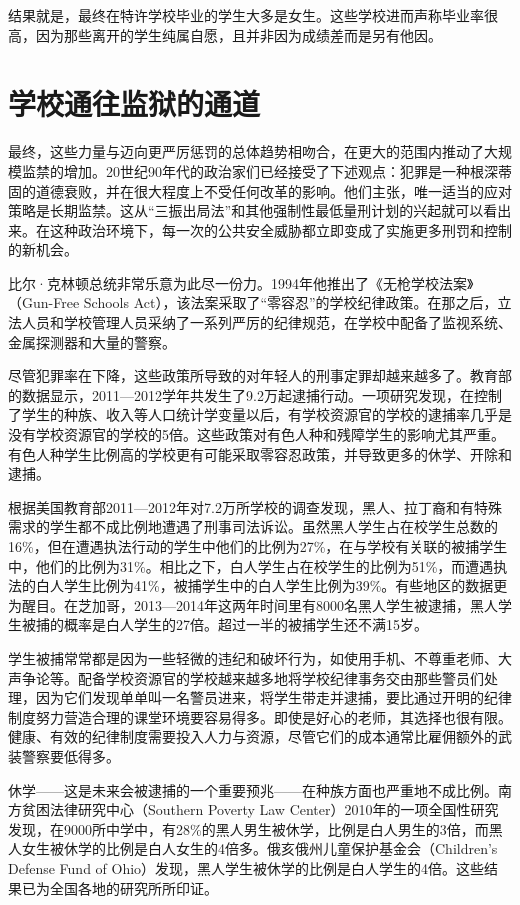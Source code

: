 \documentclass[fontset=fandol, a4paper, 12pt, openright]{ctexbook}
\begin{document}
结果就是，最终在特许学校毕业的学生大多是女生。这些学校进而声称毕业率很高，因为那些离开的学生纯属自愿，且并非因为成绩差而是另有他因。

\section{学校通往监狱的通道}

最终，这些力量与迈向更严厉惩罚的总体趋势相吻合，在更大的范围内推动了大规模监禁的增加。20世纪90年代的政治家们已经接受了下述观点：犯罪是一种根深蒂固的道德衰败，并在很大程度上不受任何改革的影响。他们主张，唯一适当的应对策略是长期监禁。这从“三振出局法”和其他强制性最低量刑计划的兴起就可以看出来。在这种政治环境下，每一次的公共安全威胁都立即变成了实施更多刑罚和控制的新机会。

比尔·克林顿总统非常乐意为此尽一份力。1994年他推出了《无枪学校法案》（Gun-Free Schools Act），该法案采取了“零容忍”的学校纪律政策。在那之后，立法人员和学校管理人员采纳了一系列严厉的纪律规范，在学校中配备了监视系统、金属探测器和大量的警察。

尽管犯罪率在下降，这些政策所导致的对年轻人的刑事定罪却越来越多了。教育部的数据显示，2011—2012学年共发生了9.2万起逮捕行动。一项研究发现，在控制了学生的种族、收入等人口统计学变量以后，有学校资源官的学校的逮捕率几乎是没有学校资源官的学校的5倍。这些政策对有色人种和残障学生的影响尤其严重。有色人种学生比例高的学校更有可能采取零容忍政策，并导致更多的休学、开除和逮捕。

根据美国教育部2011—2012年对7.2万所学校的调查发现，黑人、拉丁裔和有特殊需求的学生都不成比例地遭遇了刑事司法诉讼。虽然黑人学生占在校学生总数的16\%，但在遭遇执法行动的学生中他们的比例为27\%，在与学校有关联的被捕学生中，他们的比例为31\%。相比之下，白人学生占在校学生的比例为51\%，而遭遇执法的白人学生比例为41\%，被捕学生中的白人学生比例为39\%。有些地区的数据更为醒目。在芝加哥，2013—2014年这两年时间里有8000名黑人学生被逮捕，黑人学生被捕的概率是白人学生的27倍。超过一半的被捕学生还不满15岁。

学生被捕常常都是因为一些轻微的违纪和破坏行为，如使用手机、不尊重老师、大声争论等。配备学校资源官的学校越来越多地将学校纪律事务交由那些警员们处理，因为它们发现单单叫一名警员进来，将学生带走并逮捕，要比通过开明的纪律制度努力营造合理的课堂环境要容易得多。即使是好心的老师，其选择也很有限。健康、有效的纪律制度需要投入人力与资源，尽管它们的成本通常比雇佣额外的武装警察要低得多。

休学——这是未来会被逮捕的一个重要预兆——在种族方面也严重地不成比例。南方贫困法律研究中心（Southern Poverty Law Center）2010年的一项全国性研究发现，在9000所中学中，有28\%的黑人男生被休学，比例是白人男生的3倍，而黑人女生被休学的比例是白人女生的4倍多。俄亥俄州儿童保护基金会（Children's Defense Fund of Ohio）发现，黑人学生被休学的比例是白人学生的4倍。这些结果已为全国各地的研究所所印证。
\end{document}
